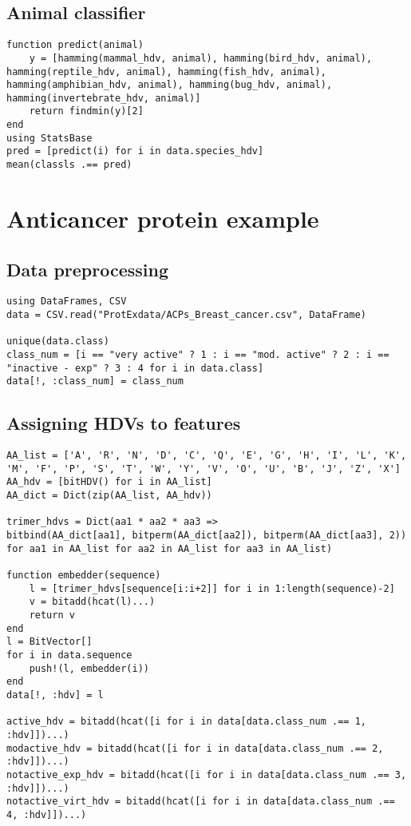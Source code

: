 \subsection{Animal classifier}
\begin{verbatim}
function predict(animal)
    y = [hamming(mammal_hdv, animal), hamming(bird_hdv, animal), hamming(reptile_hdv, animal), hamming(fish_hdv, animal), hamming(amphibian_hdv, animal), hamming(bug_hdv, animal), hamming(invertebrate_hdv, animal)]
    return findmin(y)[2]
end
using StatsBase
pred = [predict(i) for i in data.species_hdv]
mean(classls .== pred)
\end{verbatim}
\section{Anticancer protein example}
\subsection{Data preprocessing}
\begin{verbatim}
using DataFrames, CSV
data = CSV.read("ProtExdata/ACPs_Breast_cancer.csv", DataFrame)

unique(data.class)
class_num = [i == "very active" ? 1 : i == "mod. active" ? 2 : i == "inactive - exp" ? 3 : 4 for i in data.class]
data[!, :class_num] = class_num
\end{verbatim}
\subsection{Assigning HDVs to features}
\begin{verbatim}
AA_list = ['A', 'R', 'N', 'D', 'C', 'Q', 'E', 'G', 'H', 'I', 'L', 'K', 'M', 'F', 'P', 'S', 'T', 'W', 'Y', 'V', 'O', 'U', 'B', 'J', 'Z', 'X']
AA_hdv = [bitHDV() for i in AA_list]
AA_dict = Dict(zip(AA_list, AA_hdv))

trimer_hdvs = Dict(aa1 * aa2 * aa3 => 
bitbind(AA_dict[aa1], bitperm(AA_dict[aa2]), bitperm(AA_dict[aa3], 2)) 
for aa1 in AA_list for aa2 in AA_list for aa3 in AA_list)

function embedder(sequence)
    l = [trimer_hdvs[sequence[i:i+2]] for i in 1:length(sequence)-2]
    v = bitadd(hcat(l)...)
    return v
end
l = BitVector[]
for i in data.sequence
    push!(l, embedder(i))
end
data[!, :hdv] = l

active_hdv = bitadd(hcat([i for i in data[data.class_num .== 1, :hdv]])...)
modactive_hdv = bitadd(hcat([i for i in data[data.class_num .== 2, :hdv]])...)
notactive_exp_hdv = bitadd(hcat([i for i in data[data.class_num .== 3, :hdv]])...)
notactive_virt_hdv = bitadd(hcat([i for i in data[data.class_num .== 4, :hdv]])...)
\end{verbatim}
